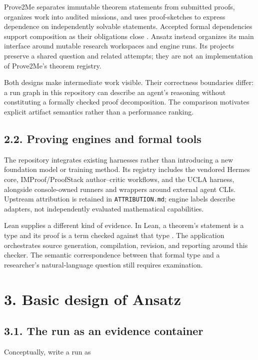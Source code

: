 \documentclass[11pt,a4paper]{article}
\begin{document}
Prove2Me separates immutable theorem statements from submitted proofs, organizes work into audited missions, and uses proof-sketches to express dependence on independently solvable statements. Accepted formal dependencies support composition as their obligations close \cite{prove2me}. Ansatz instead organizes its main interface around mutable research workspaces and engine runs. Its projects preserve a shared question and related attempts; they are not an implementation of Prove2Me's theorem registry.

Both designs make intermediate work visible. Their correctness boundaries differ: a run graph in this repository can describe an agent's reasoning without constituting a formally checked proof decomposition. The comparison motivates explicit artifact semantics rather than a performance ranking.

\subsection*{2.2. Proving engines and formal tools}

The repository integrates existing harnesses rather than introducing a new foundation model or training method. Its registry includes the vendored Hermes core, IMProof/ProofStack author--critic workflows, and the UCLA harness, alongside console-owned runners and wrappers around external agent CLIs. Upstream attribution is retained in \nolinkurl{ATTRIBUTION.md}; engine labels describe adapters, not independently evaluated mathematical capabilities.

Lean supplies a different kind of evidence. In Lean, a theorem's statement is a type and its proof is a term checked against that type \cite{lean4}. The application orchestrates source generation, compilation, revision, and reporting around this checker. The semantic correspondence between that formal type and a researcher's natural-language question still requires examination.

\section*{3. Basic design of Ansatz}

\subsection*{3.1. The run as an evidence container}

Conceptually, write a run as
\end{document}
